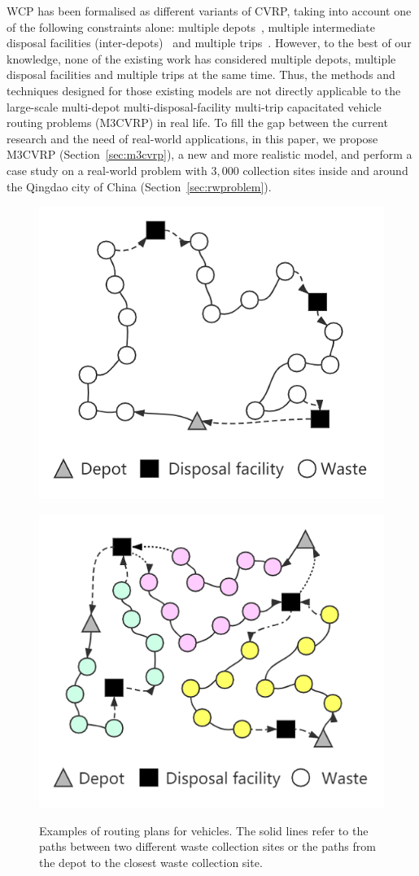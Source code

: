 \documentclass[journal]{IEEEtran}
\begin{document}
WCP has been formalised as different variants of CVRP, taking into account one of the following constraints alone: 
multiple depots~\cite{Gruler2017Supporting}, multiple intermediate disposal facilities (inter-depots)~\cite{Liu2012A} and multiple trips~\cite{belien2014municipal}.
However, to the best of our knowledge, none of the existing work has considered multiple depots, multiple disposal facilities and multiple trips at the same time. Thus, the methods and techniques designed for those existing models are not directly applicable to the large-scale multi-depot multi-disposal-facility multi-trip capacitated vehicle routing problems (M3CVRP) in real life.
To fill the gap between the current research and the need of real-world applications, in this paper, we propose M3CVRP (Section~\ref{sec:m3cvrp}), a new and more realistic model, and perform a case study on a real-world problem with $3,000$ collection sites inside and around the Qingdao city of China (Section~\ref{sec:rwproblem}). 

\begin{figure}[htbp]
\centering
\begin{subfloat}{\includegraphics[width=.23\textwidth]{PPSN1.png}}
\end{subfloat}\hfill
\begin{subfloat}{\includegraphics[width=.23\textwidth]{PPSN2.png}}
\end{subfloat}
\caption{\label{fig:routes}Examples of routing plans for vehicles. The solid lines refer to the paths between two different waste collection sites or the paths from the depot to the closest waste collection site.}
\end{figure}
\end{document}
